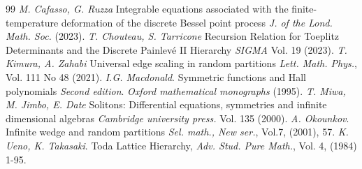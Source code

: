 \documentclass[12pt]{amsart}
\theoremstyle{definition}
\begin{document}
\begin{thebibliography}{99}
 \emph{M. Cafasso, G. Ruzza} Integrable equations associated with the finite-temperature deformation of the discrete Bessel point process {\it J. of the Lond. Math. Soc.}  (2023).
 \emph{T. Chouteau, S. Tarricone} Recursion Relation for Toeplitz Determinants
and the Discrete Painlev\'e II Hierarchy {\it SIGMA} Vol. 19 (2023).
 \emph{T. Kimura, A. Zahabi} Universal edge scaling in random partitions {\it Lett. Math. Phys.}, Vol. 111 No 48 (2021).
\emph{I.G. Macdonald}. Symmetric functions and Hall polynomials {\it Second edition}. {\it Oxford mathematical monographs} (1995).
 \emph{T. Miwa, M. Jimbo, E. Date} Solitons: Differential equations, symmetries and infinite dimensional algebras {\it Cambridge university press.} Vol. 135 (2000). 
 \emph{A. Okounkov}. Infinite wedge and random partitions {\it Sel. math., New ser.}, Vol.7, (2001), 57.
 \emph{K. Ueno, K. Takasaki}. Toda Lattice Hierarchy, {\it Adv. Stud. Pure Math.}, Vol. 4,  (1984) 1-95.
\end{thebibliography}
\end{document}
